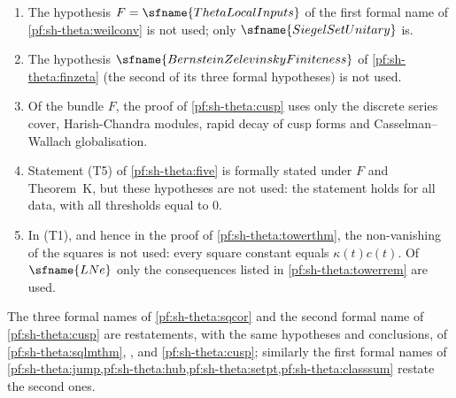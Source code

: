 \begin{remark}\label{pf:sh-theta:rem:unused}
\begin{enumerate}[label=(\alph*)]
\item The hypothesis $F=\sfname{ThetaLocalInputs}$ of the first formal name of \cref{pf:sh-theta:weilconv} is not used; only
$\sfname{SiegelSetUnitary}$ is.
\item The hypothesis $\sfname{BernsteinZelevinskyFiniteness}$ of \cref{pf:sh-theta:finzeta} (the second of its three formal
hypotheses) is not used.
\item Of the bundle $F$, the proof of \cref{pf:sh-theta:cusp} uses only the discrete series cover, Harish-Chandra modules, rapid
decay of cusp forms and Casselman--Wallach globalisation.
\item Statement (T5) of \cref{pf:sh-theta:five} is formally stated under $F$ and Theorem~K, but these hypotheses are not used: the
statement holds for all data, with all thresholds equal to $0$.
\item In (T1), and hence in the proof of \cref{pf:sh-theta:towerthm}, the non-vanishing of the squares is not used: every square
constant equals $\kappa(t)c(t)$. Of $\sfname{LNe}$ only the consequences listed in \cref{pf:sh-theta:towerrem} are used.
\end{enumerate}
\end{remark}

\begin{remark}[Restatements]\label{pf:sh-theta:rem:wrappers}
The three formal names of \cref{pf:sh-theta:sqcor} and the second formal name of \cref{pf:sh-theta:cusp} are restatements, with the
same hypotheses and conclusions, of \cref{pf:sh-theta:sqlmthm}, ,
 and \cref{pf:sh-theta:cusp}; similarly the first formal names of
\cref{pf:sh-theta:jump,pf:sh-theta:hub,pf:sh-theta:setpt,pf:sh-theta:classsum} restate the second ones.
\end{remark}

